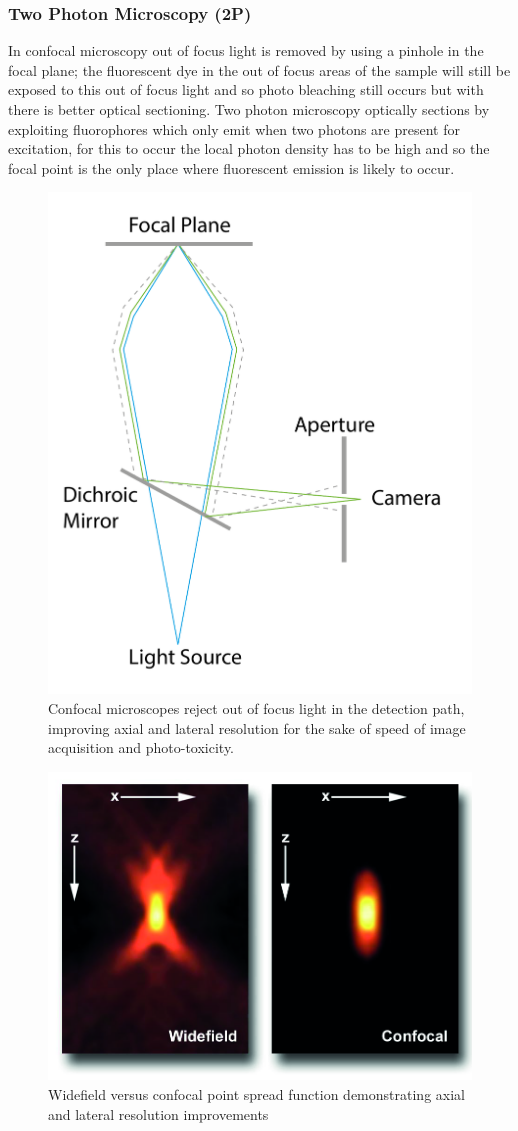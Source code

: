 \subsubsection{Two Photon Microscopy (2P)}
In confocal microscopy out of focus light is removed by using a pinhole in the focal plane; the fluorescent dye in the out of focus areas of the sample will still be exposed to this out of focus light and so photo bleaching still occurs but with there is better optical sectioning\cite{Helmchen2005}.
Two photon microscopy optically sections by exploiting fluorophores which only emit when two photons are present for excitation, for this to occur the local photon density has to be high and so the focal point is the only place where fluorescent emission is likely to occur.

\begin{figure}
\centering
\includegraphics[width=0.4\linewidth]{confocal_optical.pdf}
\caption[Confocal microscope principle]{Confocal microscopes reject out of focus light in the detection path, improving axial and lateral resolution for the sake of speed of image acquisition and photo-toxicity.}
\label{fig:confocal_optical}
\end{figure}

\begin{figure}
	\centering
	\includegraphics[width=0.7\linewidth]{confocal_otf}
	\caption[Confocal resolution improvement]{Widefield versus confocal point spread function demonstrating axial and lateral resolution improvements\cite{Claxton2006}}
	\label{fig:confocal_otf}
\end{figure}

